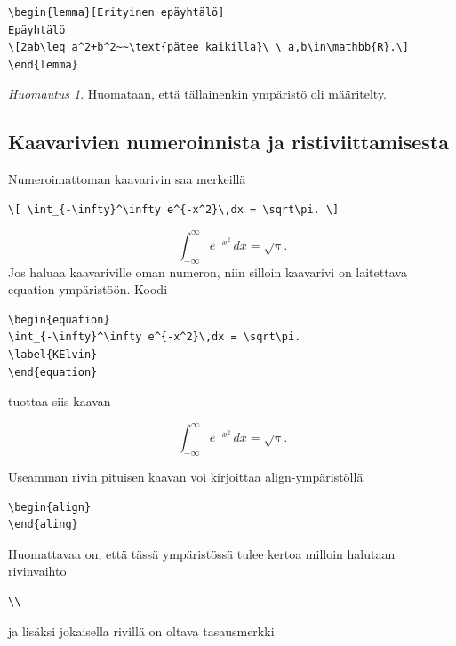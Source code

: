 \documentclass[a4paper,12 pt]{article}
\theoremstyle{plain}
\newtheorem{lemma}[lause]{Lemma}
\theoremstyle{definition}
\theoremstyle{remark}
\newtheorem{huomautus}[lause]{Huomautus}
\numberwithin{equation}{section}
\numberwithin{figure}{section}
\begin{document}
\begin{verbatim}
\begin{lemma}[Erityinen epäyhtälö]
Epäyhtälö
\[2ab\leq a^2+b^2~~\text{pätee kaikilla}\ \ a,b\in\mathbb{R}.\]
\end{lemma}
\end{verbatim}

\begin{huomautus}
Huomataan, että tällainenkin ympäristö oli määritelty.
\end{huomautus}

\subsection{Kaavarivien numeroinnista ja ristiviittamisesta}

Numeroimattoman kaavarivin saa merkeillä 
\begin{verbatim}
\[ \int_{-\infty}^\infty e^{-x^2}\,dx = \sqrt\pi. \]
\end{verbatim}
\[
\int_{-\infty}^\infty e^{-x^2}\,dx = \sqrt\pi.
\]
Jos haluaa kaavariville oman numeron, niin silloin kaavarivi on laitettava equation-ympäristöön. Koodi

\begin{verbatim}
\begin{equation}
\int_{-\infty}^\infty e^{-x^2}\,dx = \sqrt\pi.
\label{KElvin}
\end{equation}
\end{verbatim}
tuottaa siis kaavan

\begin{equation}
\int_{-\infty}^\infty e^{-x^2}\,dx = \sqrt\pi.
\label{KElvin}
\end{equation}


\noindent
Useamman rivin pituisen kaavan voi kirjoittaa align-ympäristöllä

\begin{verbatim}
\begin{align}
\end{aling}
\end{verbatim}
Huomattavaa on, että tässä ympäristössä tulee kertoa milloin halutaan rivinvaihto 

\begin{verbatim}
\\    
\end{verbatim}
ja lisäksi jokaisella rivillä on oltava tasausmerkki 
\end{document}
